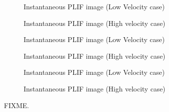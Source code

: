 \begin{figure}

\centering

\hfill
\begin{subfigure}{0.45\linewidth}
  \centering
  
  \caption{Instantaneous PLIF image (Low Velocity case)}
  \label{fig:frame90}
\end{subfigure}
\hfill
\begin{subfigure}{0.45\linewidth}
  \centering
  
  \caption{Instantaneous PLIF image (High velocity case)}
  \label{fig:frame91}
\end{subfigure}
\hfill

\hfill
\begin{subfigure}{0.45\linewidth}
  \centering
  
  \caption{Instantaneous PLIF image (Low Velocity case)}
  \label{fig:frame92}
\end{subfigure}
\hfill
\begin{subfigure}{0.45\linewidth}
  \centering
  
  \caption{Instantaneous PLIF image (High velocity case)}
  \label{fig:frame93}
\end{subfigure}
\hfill

\hfill
\begin{subfigure}{0.45\linewidth}
  \centering
  
  \caption{Instantaneous PLIF image (Low Velocity case)}
  \label{fig:frame94}
\end{subfigure}
\hfill
\begin{subfigure}{0.45\linewidth}
  \centering
  
  \caption{Instantaneous PLIF image (High velocity case)}
  \label{fig:frame95}
\end{subfigure}
\hfill

\caption[Effect of Equivalence Ratio]{FIXME.}

\label{fig:frameSequence}

\end{figure}

